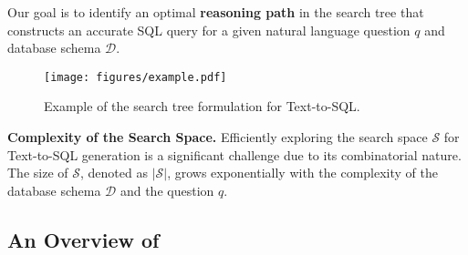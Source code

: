 Our goal is to identify an optimal \textbf{reasoning path} in the search tree that constructs an accurate SQL query for a given natural language question $q$ and database schema $\mathcal{D}$.

% 
% 
% 


\begin{figure}[t!]
    \centering
\texttt{[image: figures/example.pdf]}
\vspace{-2em}
    \caption{Example of the search tree formulation for Text-to-SQL.}
    \label{fig:enter-label}
    \vspace{-1em}
\end{figure}

\textbf{Complexity of the Search Space.}
Efficiently exploring the search space $\mathcal{S}$ for Text-to-SQL generation is a significant challenge due to its combinatorial nature. The size of $\mathcal{S}$, denoted as $|\mathcal{S}|$, grows exponentially with the complexity of the database schema $\mathcal{D}$ and the question $q$. 



\subsection{An Overview of \sys}
\label{sub:overview}

